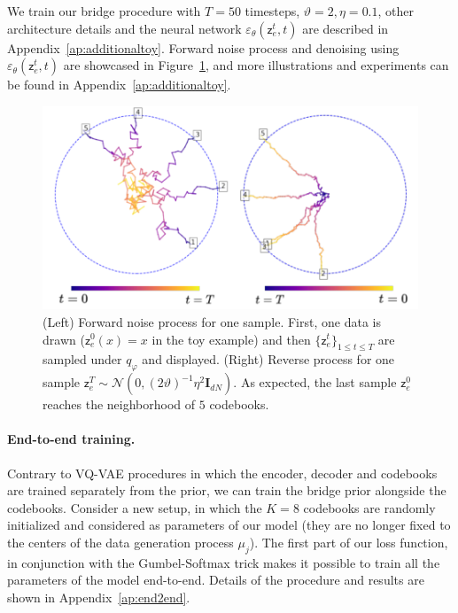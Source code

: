 \documentclass{article}
\theoremstyle{plain}
\theoremstyle{definition}
\theoremstyle{remark}
\newcommand{\latentcont}{\mathsf{z}_e}
\begin{document}
We train our bridge procedure with $T=50$ timesteps, $\vartheta=2, \eta=0.1$, other architecture details and the neural network $\varepsilon_\theta(\latentcont^t ,t)$ are described in Appendix~\ref{ap:additionaltoy}. Forward noise process and denoising using $\varepsilon_\theta(\latentcont^t ,t)$ are showcased in Figure~\ref{fig:noisedenoise}, and more illustrations and experiments can be found in Appendix~\ref{ap:additionaltoy}. 

\begin{figure}[h!]
    \centering
    \includegraphics[scale=0.55]{./noisedenoise2.pdf}
    \caption{(Left) Forward noise process for one sample. First, one data is drawn ($\latentcont^0(x) =x$ in the toy example)  and then $\{\latentcont^t\}_{1\leq t \leq T}$ are sampled under $q_\varphi$ and displayed. 
    (Right) Reverse process for one sample $\latentcont^T\sim  \mathcal{N}(0, (2\vartheta)^{-1}\eta^2 \mathbf{I}_{dN})$. As expected, the last sample $\latentcont^0$ reaches the neighborhood of $5$ codebooks.}
    \label{fig:noisedenoise}
\end{figure}

 
\paragraph{End-to-end training. } Contrary to VQ-VAE procedures in which the encoder, decoder and codebooks are trained separately from the prior, we can train the bridge prior alongside the codebooks. Consider a new setup, in which the $K=8$ codebooks are randomly initialized and considered as parameters of our model (they are no longer fixed to the centers of the data generation process $\mu_j$). The first part of our loss function, in conjunction with the Gumbel-Softmax trick makes it possible to train all the parameters of the model end-to-end. Details of the procedure and results are shown in Appendix~\ref{ap:end2end}.
\end{document}
